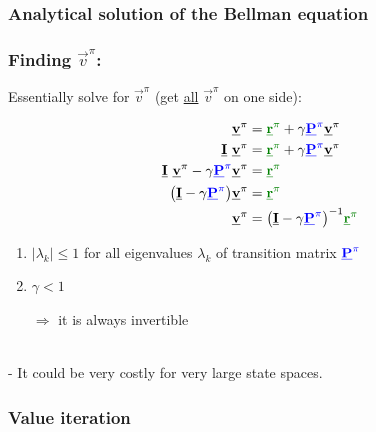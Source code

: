 \subsubsection{Analytical solution of the Bellman equation}\label{sec:findvanalytical}

\begin{frame}\frametitle{Finding $\vec v^\pi$:~\subsubsecname}

Essentially solve for $\vec v^\pi$ (get \underline{all} $\vec v^\pi$ on one side):

	\begin{align}
		\vec v^\pi &= {\color{reward}\vec r^\pi} 
		+ \gamma {\color{trans}\vec P^\pi} \vec v^\pi \\
		\vec I~\vec v^\pi 
        &= {\color{reward}\vec r^\pi}
		+ \gamma {\color{trans}\vec P^\pi} \vec v^\pi
	\\
		\vec I~\vec v^\pi - \gamma {\color{trans}\vec P^\pi} \vec v^\pi
		&= {\color{reward}\vec r^\pi}
	\\
		\big(\vec I - \gamma {\color{trans}\vec P^\pi}\big) \vec v^\pi
		&= {\color{reward}\vec r^\pi}
	\\
	\vec v^\pi &= \big(\vec I 
			- \gamma {\color{trans}\vec P^\pi}\big)^{-1}
		 {\color{reward}\vec r^\pi}
	\end{align}
	
		
\begin{enumerate}
\item $|\lambda_k| \leq 1$ for all eigenvalues 
				$\lambda_k$ of transition matrix ${\color{trans}\vec P^\pi}$
\item $\gamma < 1$
\item[$\Rightarrow$] it is always invertible
\end{enumerate}

\slidesonly{\vspace{-5mm}}

\\

\pause 
- It could be very costly for very large state spaces.

\end{frame}


\subsubsection{Value iteration}\label{sec:findviter}

